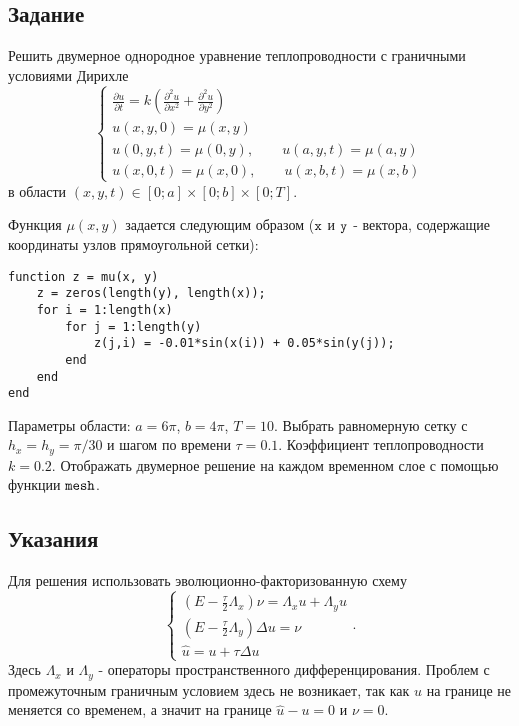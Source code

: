 \chapter{}

\section{Задание}
Решить двумерное однородное уравнение теплопроводности с граничными условиями Дирихле 
\begin{equation} \label{c10eq1}
	\begin{cases}
		\displaystyle \frac{\partial u}{\partial t} = k \left( \frac{\partial^2 u}{\partial x^2} + \frac{\partial^2 u}{\partial y^2} \right) \\
		\displaystyle u(x,y,0) = \mu(x,y) \\
		u(0,y,t) = \mu(0,y), \qquad u(a,y,t) = \mu(a,y)\\  
		u(x,0,t) = \mu(x,0), \qquad u(x,b,t) = \mu(x,b)
	\end{cases}
\end{equation}
в области $(x,y,t) \in [0; a] \times [0; b] \times [0; T]$.

Функция $\mu(x,y)$ задается следующим образом ($\texttt{\lstinline|x|}$ и $\texttt{\lstinline|y|}$ - вектора, содержащие координаты узлов прямоугольной сетки):
\begin{matlablisting}
	\begin{lstlisting}
function z = mu(x, y)
    z = zeros(length(y), length(x));
    for i = 1:length(x)
        for j = 1:length(y)
            z(j,i) = -0.01*sin(x(i)) + 0.05*sin(y(j));
        end
    end
end
	\end{lstlisting}
\end{matlablisting}
Параметры области: $a = 6\pi$, $b = 4\pi$, $T = 10$. Выбрать равномерную сетку с $h_x = h_y = \pi/30$ и шагом по времени $\tau = 0.1$. Коэффициент теплопроводности $k = 0.2$. Отображать двумерное решение на каждом временном слое с помощью функции $\texttt{\lstinline|mesh|}$.

\section{Указания}
Для решения использовать эволюционно-факторизованную схему
\begin{equation} \label{c10eq2}
	\begin{cases}
		\displaystyle \left( E - \frac{\tau}{2} \Lambda_x \right) \nu = \Lambda_x u + \Lambda_y u \\
		\displaystyle \left( E - \frac{\tau}{2} \Lambda_y \right) \Delta u = \nu \\
		\hat{u} = u + \tau \Delta u
	\end{cases}.
\end{equation}
Здесь $\Lambda_x$ и $\Lambda_y$ - операторы пространственного дифференцирования. Проблем с промежуточным граничным условием здесь не возникает, так как $u$ на границе не меняется со временем, а значит на границе $\hat{u} - u = 0$ и $\nu = 0$.


